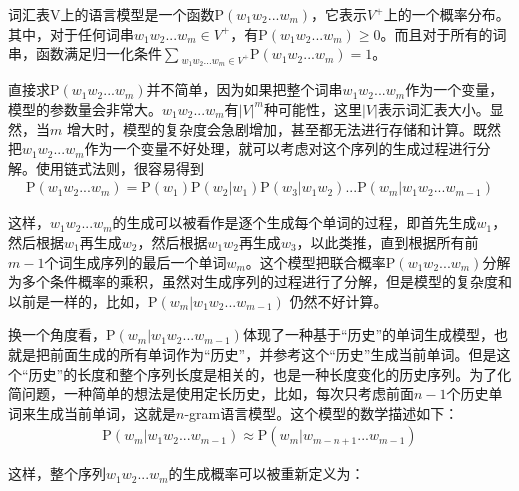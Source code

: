 \vspace{0.5em}
\begin{definition}[]
词汇表V上的语言模型是一个函数$\textrm{P}(w_1 w_2...w_m)$，它表示$V^+$上的一个概率分布。其中，对于任何词串$w_1 w_2...w_m\in{V^+}$，有$\textrm{P}(w_1 w_2...w_m)\geq{0}$。而且对于所有的词串，函数满足归一化条件$\sum{_{w_1 w_2...w_m\in{V^+}}\textrm{P}(w_1 w_2...w_m)}=1$。
\end{definition}

\parinterval 直接求$\textrm{P}(w_1 w_2...w_m)$并不简单，因为如果把整个词串$w_1 w_2...w_m$作为一个变量，模型的参数量会非常大。$w_1 w_2...w_m$有$|V|^m$种可能性，这里$|V|$表示词汇表大小。显然，当$m$ 增大时，模型的复杂度会急剧增加，甚至都无法进行存储和计算。既然把$w_1 w_2...w_m$作为一个变量不好处理，就可以考虑对这个序列的生成过程进行分解。使用链式法则，很容易得到
\begin{eqnarray}
\textrm{P}(w_1 w_2...w_m)=\textrm{P}(w_1)\textrm{P}(w_2|w_1)\textrm{P}(w_3|w_1 w_2)...\textrm{P}(w_m|w_1 w_2...w_{m-1})
\label{eq:2-22}
\end{eqnarray}

这样，$w_1 w_2...w_m$的生成可以被看作是逐个生成每个单词的过程，即首先生成$w_1$，然后根据$w_1$再生成$w_2$，然后根据$w_1 w_2$再生成$w_3$，以此类推，直到根据所有前$m-1$个词生成序列的最后一个单词$w_m$。这个模型把联合概率$\textrm{P}(w_1 w_2...w_m)$分解为多个条件概率的乘积，虽然对生成序列的过程进行了分解，但是模型的复杂度和以前是一样的，比如，$\textrm{P}(w_m|w_1 w_2...w_{m-1})$ 仍然不好计算。

\parinterval 换一个角度看，$\textrm{P}(w_m|w_1 w_2...w_{m-1})$体现了一种基于``历史''的单词生成模型，也就是把前面生成的所有单词作为``历史''，并参考这个``历史''生成当前单词。但是这个``历史''的长度和整个序列长度是相关的，也是一种长度变化的历史序列。为了化简问题，一种简单的想法是使用定长历史，比如，每次只考虑前面$n-1$个历史单词来生成当前单词，这就是$n$-gram语言模型。这个模型的数学描述如下：
\begin{eqnarray}
\textrm{P}(w_m|w_1 w_2...w_{m-1}) \approx \textrm{P}(w_m|w_{m-n+1}...w_{m-1})
\label{eq:2-23}
\end{eqnarray}

\parinterval 这样，整个序列$w_1 w_2...w_m$的生成概率可以被重新定义为：

